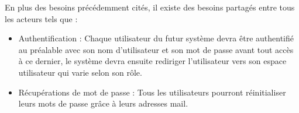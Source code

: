                 En plus des besoins précédemment cités, il existe des besoins partagés entre tous les acteurs tels que :
                
                
                \begin{itemize}
                    \item [\textbullet] Authentification : Chaque utilisateur du futur système devra être authentifié au préalable avec son nom d’utilisateur et son mot de passe avant tout accès à ce dernier, le système devra ensuite rediriger l’utilisateur vers son espace utilisateur qui varie selon son rôle.

                    \item [\textbullet] Récupérations de mot de passe : Tous les utilisateurs pourront réinitialiser leurs mots de passe grâce à leurs adresses mail.
                    
                \end{itemize}
            
